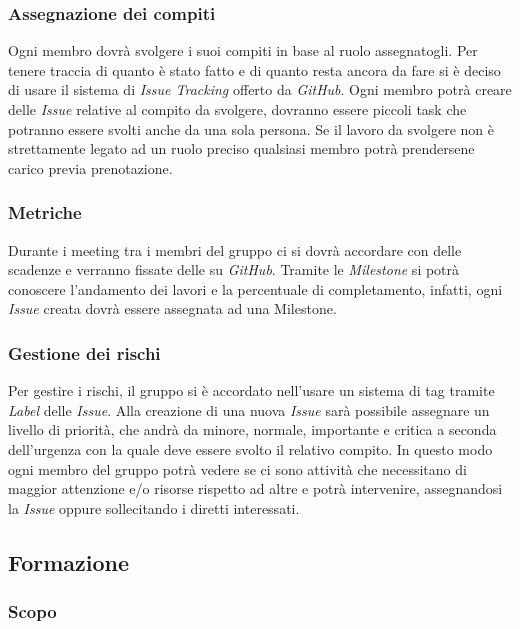 \subsubsection{Assegnazione dei compiti}

Ogni membro dovrà svolgere i suoi compiti in base al ruolo assegnatogli. Per tenere traccia di quanto è stato fatto e 
di quanto resta ancora da fare si è deciso di usare il sistema di \emph{Issue Tracking} offerto da \emph{GitHub}. Ogni 
membro potrà creare delle \emph{Issue} relative al compito da svolgere, dovranno essere piccoli task che potranno 
essere svolti anche da una sola persona. Se il lavoro da svolgere non è strettamente legato ad un ruolo preciso qualsiasi membro potrà prendersene carico previa prenotazione.

\subsubsection{Metriche}

Durante i meeting tra i membri del gruppo ci si dovrà accordare con delle scadenze e verranno fissate delle 
 su \emph{GitHub}. Tramite le \emph{Milestone} si potrà conoscere l'andamento dei lavori e la 
percentuale di completamento, infatti, ogni \emph{Issue} creata dovrà essere assegnata ad una Milestone. 

\subsubsection{Gestione dei rischi}

Per gestire i rischi, il gruppo si è accordato nell'usare un sistema di tag tramite \emph{Label} delle \emph{Issue}. 
Alla creazione di una nuova \emph{Issue} sarà possibile assegnare un livello di priorità, che andrà da minore, normale, 
importante e critica a seconda dell'urgenza con la quale deve essere svolto il relativo compito. In questo modo ogni 
membro del gruppo potrà vedere se ci sono attività che necessitano di maggior attenzione e/o risorse rispetto ad altre 
e potrà intervenire, assegnandosi la \emph{Issue} oppure sollecitando i diretti interessati.

\subsection{Formazione}

\subsubsection{Scopo}

